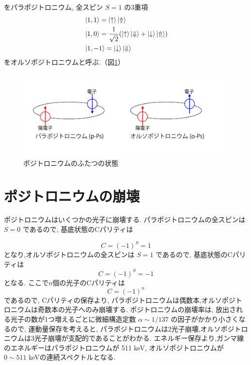 をパラポジトロニウム,
全スピン $S = 1$ の3重項
\begin{equation}
\begin{split}
&\ket{1,1} = \ket{ \uparrow } \ket{ \Uparrow } \\
&\ket{1,0} = \frac{1}{\sqrt{2}} ( \ket{ \uparrow } \ket{ \Downarrow } + \ket{ \downarrow } \ket{ \Uparrow }) \\
&\ket{1,-1} = \ket{ \downarrow } \ket{ \Downarrow }
\end{split}
\label{eq:ortho}
\end{equation}
をオルソポジトロニウムと呼ぶ.（図\ref{fig:Ps}）

\begin{figure}[H]
\centering
\includegraphics[keepaspectratio, scale=0.4]{fig/ybm/Ps.pdf}
\caption{ポジトロニウムのふたつの状態}
\label{fig:Ps}
\end{figure}


\section{ポジトロニウムの崩壊}

ポジトロニウムはいくつかの光子に崩壊する.
パラポジトロニウムの全スピンは $S=0$ であるので,
基底状態のCパリティは

\begin{equation}
	\nonumber
C = (-1)^{S} = 1
\end{equation}
となり,オルソポジトロニウムの全スピンは $S=1$ であるので,
基底状態のCパリティは
\begin{equation}
	\nonumber
C = (-1)^{S} = -1
\end{equation}
となる.
ここで$n$個の光子のCパリティは
\begin{equation}
	\nonumber
C = (-1)^{n}
\end{equation}
であるので,
Cパリティの保存より,
パラポジトロニウムは偶数本,オルソポジトロニウムは奇数本の光子へのみ崩壊する.
ポジトロニウムの崩壊率は,
放出される光子の数が1つ増えるごとに微細構造定数 $\alpha \sim 1/137$ の因子がかかり小さくなるので,
運動量保存を考えると,
パラポジトロニウムは2光子崩壊,オルソポジトロニウムは3光子崩壊が支配的であることがわかる.
エネルギー保存より,ガンマ線のエネルギーはパラポジトロニウムが 511 keV,
オルソポジトロニウムが $0 \sim 511$  keVの連続スペクトルとなる.

